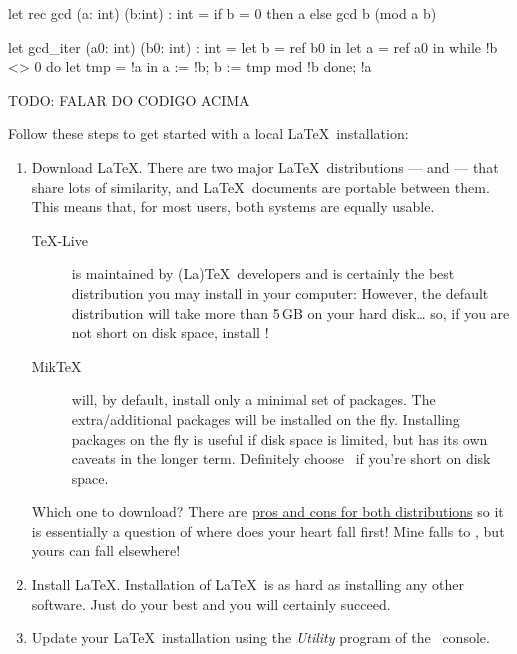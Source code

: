 \begin{ocamlsmall}
  let rec gcd (a: int) (b:int) : int =
      if b = 0 then a
      else gcd b (mod a b) 
\end{ocamlsmall}

\begin{ocamlsmall}
  let gcd_iter (a0: int) (b0: int) : int =
      let b = ref b0 in
      let a = ref a0 in
      while !b <> 0 do
          let tmp = !a in
          a := !b;
          b := tmp mod !b
      done;
      !a
\end{ocamlsmall}

TODO: FALAR DO CODIGO ACIMA

\iffalse
Follow these steps to get started with a local \LaTeX\ installation:

\begin{enumerate}
  \item Download \LaTeX.  There are two major \LaTeX\ distributions — \href{https://miktex.org/}{\MikTeX} and \href{https://www.tug.org/texlive/}{\TeXLive} — that share lots of similarity, and \LaTeX\ documents are portable between them. This means that, for most users, both systems are equally usable.
  \begin{description}
    \item [\TeX-Live] is maintained by (La)\TeX\ developers and is certainly the best distribution you may install in your computer:  However, the default distribution will take more than 5\,GB on your hard disk… so, if you are not short on disk space, install \TeXLive!
    \item[Mik\TeX] will, by default, install only a minimal set of packages. The extra/additional packages will be installed on the fly.  Installing packages on the fly is useful if disk space is limited, but has its own caveats in the longer term.  Definitely choose \MikTeX\ if you're short on disk space.
  \end{description}
  Which one to download?  There are \href{https://tex.stackexchange.com/questions/20036/what-are-the-advantages-of-tex-live-over-miktex}{pros and cons for both distributions} so it is essentially a question of where does your heart fall first!  Mine falls to \TeXLive, but yours can fall elsewhere!  \emojiSmile
  \item Install \LaTeX. Installation of \LaTeX\ is as hard as installing any other software.  Just do your best and you will certainly succeed. 
  \item Update your \LaTeX\ installation using the \emph{\TeXLive Utility} program of the \MikTeX\ console.

\end{enumerate}
